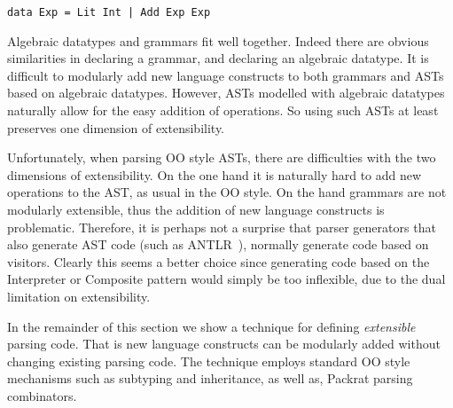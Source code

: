 \begin{lstlisting}
data Exp = Lit Int | Add Exp Exp
\end{lstlisting}

Algebraic datatypes and grammars fit well together. Indeed there are
obvious similarities in declaring a grammar, and declaring an
algebraic datatype. It is difficult to modularly add new language
constructs to both grammars and ASTs based on algebraic datatypes. However,
ASTs modelled with algebraic datatypes naturally allow for the easy
addition of operations. So using such ASTs at least preserves one
dimension of extensibility.

Unfortunately, when parsing OO style ASTs, there are difficulties with
the two dimensions of extensibility. On the one hand it is naturally hard to
add new operations to the AST, as usual in the OO style. On the hand
grammars are not modularly extensible, thus the addition of new
language constructs is problematic. Therefore,
it is perhaps not a surprise that parser generators that also generate
AST code (such as ANTLR~\cite{parr2013definitive}), normally generate code based on
visitors. Clearly this seems a better choice since generating code
based on the {\sc Interpreter} or {\sc Composite} pattern would
simply be too inflexible, due to the dual limitation on extensibility.

In the remainder of this section we show a technique for
defining \emph{extensible} parsing code. That is new
language constructs can be modularly added without changing
existing parsing code. The technique employs standard OO
style mechanisms such as subtyping and inheritance, as well as,
Packrat parsing combinators.


